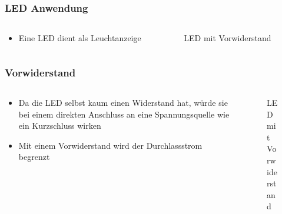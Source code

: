 \begin{frame}
\frametitle{LED Anwendung }
\begin{columns}
    \begin{column}{0.48\textwidth}
    \begin{itemize}
  \item Eine LED dient als Leuchtanzeige
  \end{itemize}

    \end{column}
   \begin{column}{0.48\textwidth}
       
\begin{figure}
    \caption{\scriptsize LED mit Vorwiderstand}
    \label{e_led_schaltung}
\end{figure}


   \end{column}
\end{columns}

\end{frame}

\begin{frame}
\end{frame}

\begin{frame}
\frametitle{Vorwiderstand}
\begin{columns}
    \begin{column}{0.48\textwidth}
    \begin{itemize}
  \item Da die LED selbst kaum einen Widerstand hat, würde sie bei einem direkten Anschluss an eine Spannungsquelle wie ein Kurzschluss wirken
  \item Mit einem Vorwiderstand wird der Durchlassstrom begrenzt
  \end{itemize}

    \end{column}
   \begin{column}{0.48\textwidth}
       
\begin{figure}
    \caption{\scriptsize LED mit Vorwiderstand}
    \label{e_led_schaltung}
\end{figure}


   \end{column}
\end{columns}

\end{frame}

